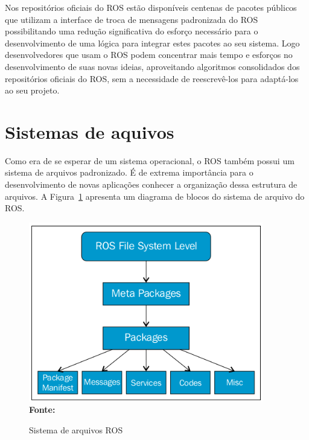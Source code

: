 Nos repositórios oficiais do ROS estão disponíveis centenas de pacotes públicos que utilizam a interface de troca de mensagens padronizada do ROS possibilitando uma redução significativa do esforço necessário para o desenvolvimento de uma lógica para integrar estes pacotes ao seu sistema. Logo desenvolvedores que usam o ROS podem concentrar mais tempo e esforços no desenvolvimento de suas novas ideias, aproveitando algoritmos consolidados dos repositórios oficiais do ROS, sem a necessidade de reescrevê-los para adaptá-los ao seu projeto.




\section{Sistemas de aquivos}
Como era de se esperar de um sistema operacional, o ROS também possui um sistema de arquivos padronizado. É de extrema importância para o desenvolvimento de novas aplicações conhecer a organização dessa estrutura de arquivos. A Figura~\ref{fig:rosfile} apresenta um diagrama de blocos do sistema de arquivo do ROS\@.

\begin{figure}[ht]
	\caption{Sistema de arquivos ROS}
	\begin{center}
		\includegraphics[scale=0.7]{imagens/fileSiystem.png}\\
		{\small \textbf{Fonte:} }
    \end{center}\label{fig:rosfile}
\end{figure}

